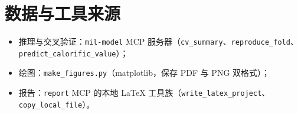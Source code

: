 \documentclass[11pt,a4paper]{ctexart}
\begin{document}
\section*{数据与工具来源}
\begin{itemize}
  \item 推理与交叉验证：\texttt{mil-model} MCP 服务器（\texttt{cv\_summary}、\texttt{reproduce\_fold}、\texttt{predict\_calorific\_value}）；
  \item 绘图：\texttt{make\_figures.py}（matplotlib，保存 PDF 与 PNG 双格式）；
  \item 报告：\texttt{report} MCP 的本地 LaTeX 工具族（\texttt{write\_latex\_project}、\texttt{copy\_local\_file}）。
\end{itemize}
\end{document}
